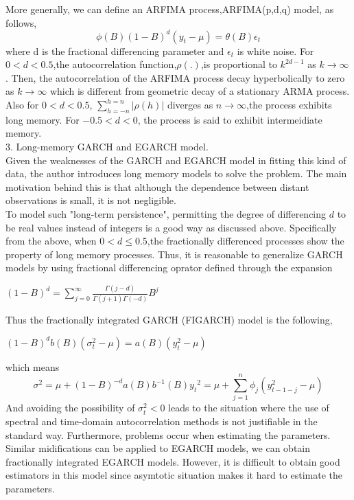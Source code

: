\documentclass[10pt,a4paper]{article}
\begin{document}
 More generally, we can define an ARFIMA process,ARFIMA(p,d,q) model, as follows,
$$\phi(B)(1-B)^d(y_t-\mu)=\theta(B)\epsilon_t$$
where d is the fractional differencing parameter and $\epsilon_t$ is white noise. For $0<d<0.5$,the autocorrelation function,$\rho(.)$,is proportional to $k^{2d-1}$ as $k\rightarrow\infty$. Then, the autocorrelation of the ARFIMA process decay hyperbolically to zero as $k\rightarrow\infty$ which is different from geometric decay of a stationary ARMA process. Also for $0<d<0.5$, $\sum_{h=-n}^{h=n} |\rho(h)|$ diverges as $n\rightarrow \infty$,the process exhibits long memory. For $-0.5<d<0$, the process is said to exhibit intermeidiate memory.  \\

3. Long-memory GARCH and EGARCH model.\\

Given the weaknesses of the GARCH and EGARCH model in fitting this kind of data, the author introduces long memory models to solve the problem. The main motivation behind this is that although the dependence between distant observations is small, it is not negligible.\\
  To model such "long-term persistence", permitting the degree of differencing $d$ to be real values instead of integers is a good way as discussed above. Specifically from the above, when $0<d\leq 0.5$,the fractionally differenced processes show the property of long memory processes. Thus, it is reasonable to generalize GARCH models by using fractional differencing oprator defined through the expansion

\begin{center}$\displaystyle (1-B)^d=\sum_{j=0}^{\infty}\frac{\Gamma(j-d)}{\Gamma(j+1)\Gamma(-d)}B^j $\end{center}

Thus the fractionally integrated GARCH (FIGARCH) model is the following,

\begin{center}$\displaystyle (1-B)^db(B)(\sigma^2_t-\mu)=a(B)(y^2_t-\mu) $\end{center}
which means
$$\sigma^2=\mu+(1-B)^{-d}a(B)b^{-1}(B){y_t}^2=\mu+\sum_{j=1}^{n}\phi_j(y_{t-1-j}^2-\mu)$$
And avoiding the possibility of $\sigma_t^2<0$ leads to the situation where the use of spectral and time-domain autocorrelation methods is not justifiable in the standard way. Furthermore, problems occur when estimating the parameters.\\
Similar midifications can be applied to EGARCH models, we can obtain fractionally integrated EGARCH models. However, it is difficult to obtain good estimators in this model since asymtotic situation makes it hard to estimate the parameters.
\end{document}
